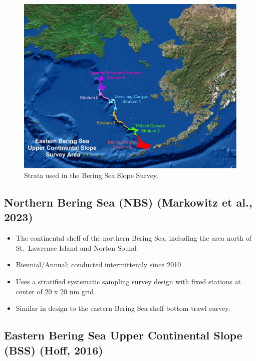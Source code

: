 \documentclass[
  letterpaper,
  oneside,
  open=any]{scrbook}
\providecommand{\tightlist}{%
  \setlength{\itemsep}{0pt}\setlength{\parskip}{0pt}}\usepackage{longtable,booktabs,array}
\begin{document}
\begin{figure}

{\centering \includegraphics[width=7.33in,height=\textheight]{content/../img/bss-strata.png}

}

\caption{Strata used in the Bering Sea Slope Survey.}

\end{figure}

\hypertarget{northern-bering-sea-nbs-2022nebs2023}{%
\subsection{\texorpdfstring{\textbf{Northern Bering Sea (NBS)}
(Markowitz et al.,
2023)}{Northern Bering Sea (NBS) (Markowitz et al., 2023)}}\label{northern-bering-sea-nbs-2022nebs2023}}

\begin{itemize}
\tightlist
\item
  The continental shelf of the northern Bering Sea, including the area
  north of St.~Lawrence Island and Norton Sound
\item
  Biennial/Annual; conducted intermittently since 2010
\item
  Uses a stratified systematic sampling survey design with fixed
  stations at center of 20 x 20 nm grid.
\item
  Similar in design to the eastern Bering Sea shelf bottom trawl survey.
\end{itemize}

\hypertarget{eastern-bering-sea-upper-continental-slope-bss-rn979}{%
\subsection{\texorpdfstring{\textbf{Eastern Bering Sea Upper Continental
Slope (BSS)} (Hoff,
2016)}{Eastern Bering Sea Upper Continental Slope (BSS) (Hoff, 2016)}}\label{eastern-bering-sea-upper-continental-slope-bss-rn979}}
\end{document}
